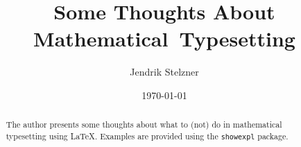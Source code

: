 \documentclass[a4paper,10pt,abstract=on]{scrartcl}
\title{Some Thoughts About Mathematical~Typesetting}
\author{Jendrik Stelzner}
\date{\today}
\begin{document}
\maketitle

\begin{abstract}
  The author presents some thoughts about what to (not) do in mathematical typesetting using \LaTeX.
  Examples are provided using the \texttt{showexpl} package.
\end{abstract}
\end{document}
